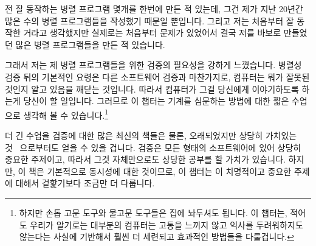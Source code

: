 
%

전 잘 동작하는 병렬 프로그램 몇개를 한번에 만든 적 있는데, 그건 제가 지난
20년간 많은 수의 병렬 프로그램들을 작성했기 때문일 뿐입니다.
그리고 저는 처음부터 잘 동작한 거라고 생각했지만 실제로는 처음부터 문제가
있었어서 결국 저를 바보로 만들었던 많은 병렬 프로그램들을 만든 적 있습니다.

그래서 저는 제 병렬 프로그램들을 위한 검증의 필요성을 강하게 느꼈습니다.
병렬성 검증 뒤의 기본적인 요령은 다른 소프트웨어 검증과 마찬가지로, 컴퓨터는
뭐가 잘못된 것인지 알고 있음을 깨닫는 것입니다.
따라서 컴퓨터가 그걸 당신에게 이야기하도록 하는게 당신이 할 일입니다.
그러므로 이 챕터는 기계를 심문하는 방법에 대한 짧은 수업으로 생각해 볼 수
있습니다.\footnote{
	하지만 손톱 고문 도구와 물고문 도구들은 집에 놔두셔도 됩니다.
	이 챕터는, 적어도 우리가 알기로는 대부분의 컴퓨터는 고통을 느끼지 않고
	익사를 두려워하지도 않는다는 사실에 기반해서 훨씬 더 세련되고 효과적인
	방법들을 다룰겁니다.}

더 긴 수업을 검증에 대한 많은 최신의 책들은 물론, 오래되었지만 상당히 가치있는
것~\cite{GlenfordJMyers1979} 으로부터도 얻을 수 있을 겁니다.
검증은 모든 형태의 소프트웨어에 있어 상당히 중요한 주제이고, 따라서 그것
자체만으로도 상당한 공부를 할 가치가 있습니다.
하지만, 이 책은 기본적으로 동시성에 대한 것이므로, 이 챕터는 이 치명적이고
중요한 주제에 대해서 겉핥기보다 조금만 더 다룹니다.
\iffalse

